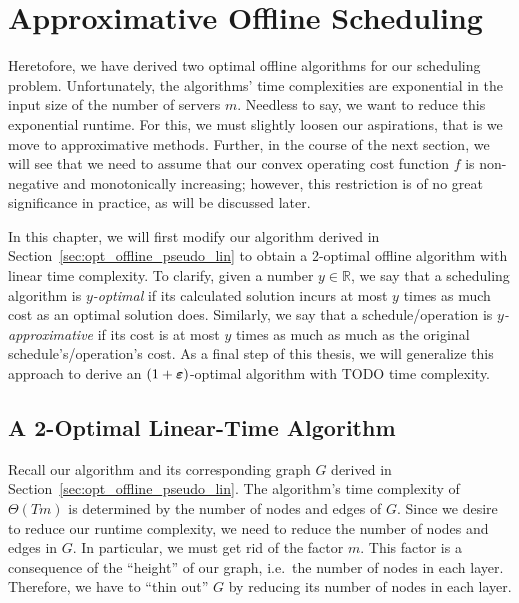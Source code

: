 
\chapter{Approximative Offline Scheduling}\label{chap:approx_offline_scheduling}
Heretofore, we have derived two optimal offline algorithms for our scheduling problem. Unfortunately, the algorithms' time complexities are exponential in the input size of the number of servers $m$. Needless to say, we want to reduce this exponential runtime. For this, we must slightly loosen our aspirations, that is we move to approximative methods. 
Further, in the course of the next section, we will see that we need to assume that our convex operating cost function $f$ is non-negative and monotonically increasing; however, this restriction is of no great significance in practice, as will be discussed later.

In this chapter, we will first modify our algorithm derived in Section~\ref{sec:opt_offline_pseudo_lin} to obtain a 2-optimal offline algorithm with linear time complexity. To clarify, given a number $y\in\mathbb{R}$, we say that a scheduling algorithm is \emph{$y$-optimal} if its calculated solution incurs at most $y$ times as much cost as an optimal solution does. Similarly, we say that a schedule/operation is \emph{$y$-approximative} if its cost is at most $y$ times as much as much as the original schedule's/operation's cost.
As a final step of this thesis, we will generalize this approach to derive an $(1+\boldsymbol\varepsilon)$-optimal algorithm with TODO time complexity.

\section{A 2-Optimal Linear-Time Algorithm}
Recall our algorithm and its corresponding graph $G$ derived in Section~\ref{sec:opt_offline_pseudo_lin}. The algorithm's time complexity of $\Theta(Tm)$ is determined by the number of nodes and edges of $G$. Since we desire to reduce our runtime complexity, we need to reduce the number of nodes and edges in $G$. In particular, we must get rid of the factor $m$. This factor is a consequence of the ``height'' of our graph, i.e.\ the number of nodes in each layer. Therefore, we have to ``thin out'' $G$ by reducing its number of nodes in each layer.

